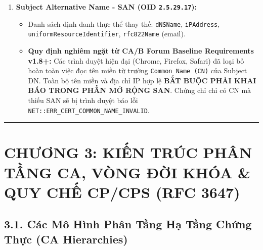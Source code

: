 \documentclass[
]{article}
\providecommand{\tightlist}{%
  \setlength{\itemsep}{0pt}\setlength{\parskip}{0pt}}
\begin{document}
\begin{enumerate}
  \begin{itemize}
  \tightlist
  \item
    \texttt{serverAuth} (\texttt{1.3.6.1.5.5.7.3.1}): Xác thực máy chủ
    Web TLS.
  \item
    \texttt{clientAuth} (\texttt{1.3.6.1.5.5.7.3.2}): Xác thực người
    dùng / máy trạm mTLS.
  \item
    \texttt{codeSigning} (\texttt{1.3.6.1.5.5.7.3.3}): Ký mã nguồn phần
    mềm, driver.
  \item
    \texttt{timeStamping} (\texttt{1.3.6.1.5.5.7.3.8}): Cấp dấu thời
    gian RFC 3161.
  \end{itemize}
\item
  \textbf{Subject Alternative Name - SAN (OID \texttt{2.5.29.17}):}

  \begin{itemize}
  \tightlist
  \item
    Danh sách định danh thực thể thay thế: \texttt{dNSName},
    \texttt{iPAddress}, \texttt{uniformResourceIdentifier},
    \texttt{rfc822Name} (email).
  \item
    \textbf{Quy định nghiêm ngặt từ CA/B Forum Baseline Requirements
    v1.8+:} Các trình duyệt hiện đại (Chrome, Firefox, Safari) đã loại
    bỏ hoàn toàn việc đọc tên miền từ trường \texttt{Common\ Name\ (CN)}
    của Subject DN. Toàn bộ tên miền và địa chỉ IP hợp lệ \textbf{BẮT
    BUỘC PHẢI KHAI BÁO TRONG PHẦN MỞ RỘNG SAN}. Chứng chỉ chỉ có CN mà
    thiếu SAN sẽ bị trình duyệt báo lỗi
    \texttt{NET::ERR\_CERT\_COMMON\_NAME\_INVALID}.
  \end{itemize}
\end{enumerate}

\begin{center}\rule{0.5\linewidth}{0.5pt}\end{center}

\section{CHƯƠNG 3: KIẾN TRÚC PHÂN TẦNG CA, VÒNG ĐỜI KHÓA \& QUY CHẾ
CP/CPS (RFC
3647)}\label{chux1b0ux1a1ng-3-kiux1ebfn-truxfac-phuxe2n-tux1ea7ng-ca-vuxf2ng-ux111ux1eddi-khuxf3a-quy-chux1ebf-cpcps-rfc-3647}

\subsection{3.1. Các Mô Hình Phân Tầng Hạ Tầng Chứng Thực (CA
Hierarchies)}\label{cuxe1c-muxf4-huxecnh-phuxe2n-tux1ea7ng-hux1ea1-tux1ea7ng-chux1ee9ng-thux1ef1c-ca-hierarchies}
\end{document}
